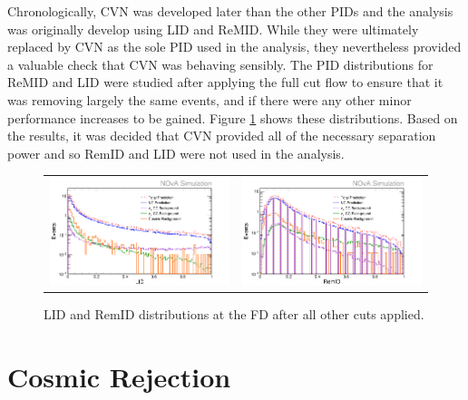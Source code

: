 Chronologically, CVN was developed later than the other PIDs and the analysis was originally develop using LID and ReMID. While they were ultimately replaced by CVN as the sole PID used in the analysis, they nevertheless provided a valuable check that CVN was behaving sensibly. The PID distributions for ReMID and LID were studied after applying the full cut flow to ensure that it was removing largely the same events, and if there were any other minor performance increases to be gained. Figure \ref{fig:NM1NCSel} shows these distributions. Based on the results, it was decided that CVN provided all of the necessary separation power and so RemID and LID were not used in the analysis.
\begin{figure}[htb]
  \centering
  \begin{tabular}{c c}
    \includegraphics[width=.47\textwidth]{figures/SelNP1/NM1ELID.png} &
    \includegraphics[width=.47\textwidth]{figures/SelNP1/NM1RmID.png} \\
  \end{tabular}
  \caption[LID and RemID Distributions at the FD]{LID and RemID distributions at the FD after all other cuts applied.}
  \label{fig:NM1NCSel}
\end{figure}

\section{Cosmic Rejection}


